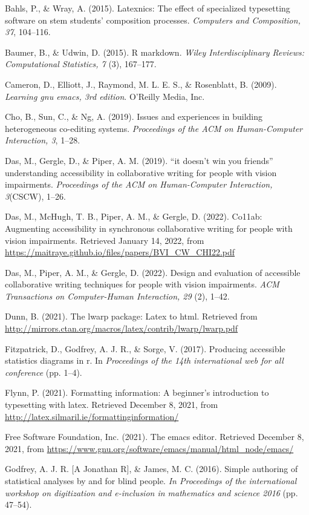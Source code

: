 \documentclass[11pt]{sig-alternate}
\begin{document}
\begin{large}
Bahls, P., \& Wray, A. (2015). Latexnics: The effect of specialized typesetting software on stem students’ composition processes. \textit{Computers and Composition, 37}, 104–116.

Baumer, B., \& Udwin, D. (2015). R markdown. \textit{Wiley Interdisciplinary Reviews: Computational Statistics, 7} (3), 167–177.

Cameron, D., Elliott, J., Raymond, M. L. E. S., \& Rosenblatt, B. (2009). \textit{Learning gnu emacs, 3rd edition}. O’Reilly Media, Inc.

Cho, B., Sun, C., \& Ng, A. (2019). Issues and experiences in building heterogeneous co-editing systems.\textit{ Proceedings of the ACM on Human-Computer Interaction, 3}, 1–28.

Das, M., Gergle, D., \& Piper, A. M. (2019). ``it doesn’t win you friends” understanding accessibility in collaborative writing for people with vision impairments. \textit{Proceedings of the ACM on Human-Computer Interaction, 3}(CSCW), 1–26.

Das, M., McHugh, T. B., Piper, A. M., \& Gergle, D. (2022). Co11ab: Augmenting accessibility in synchronous collaborative writing for people with vision impairments. Retrieved January 14, 2022, from \url{https://maitraye.github.io/files/papers/BVI\_CW\_CHI22.pdf}

Das, M., Piper, A. M., \& Gergle, D. (2022). Design and evaluation of accessible collaborative writing techniques for people with vision impairments. \textit{ACM Transactions on Computer-Human Interaction, 29} (2), 1–42.

Dunn, B. (2021). The lwarp package: Latex to html. Retrieved from \url{http://mirrors.ctan.org/macros/latex/contrib/lwarp/lwarp.pdf}

Fitzpatrick, D., Godfrey, A. J. R., \& Sorge, V. (2017). Producing accessible statistics diagrams in r. In\textit{ Proceedings of the 14th international web for all conference} (pp. 1–4).

Flynn, P. (2021). Formatting information: A beginner’s introduction to typesetting with latex. Retrieved December 8, 2021, from \url{http://latex.silmaril.ie/formattinginformation/}

Free Software Foundation, Inc. (2021). The emacs editor. Retrieved December 8, 2021, from \url{https://www.gnu.org/software/emacs/manual/html\_node/emacs/}

Godfrey, A. J. R. [A Jonathan R], \& James, M. C. (2016). Simple authoring of statistical analyses by and for blind people.\textit{ In Proceedings of the international workshop on digitization and e-inclusion in mathematics and science 2016} (pp. 47–54).


\end{large}
\end{document}

